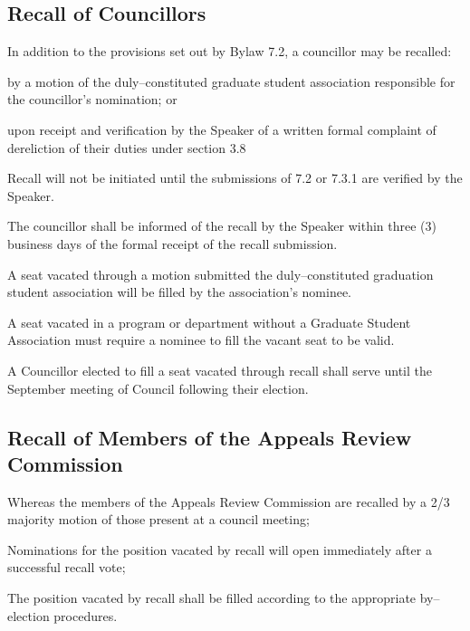 \subsection {Recall of Councillors}
\begin{longenum}[ label*=\thesubsection.\arabic*., align=left]
	\item In addition to the provisions set out by Bylaw 7.2, a councillor may be recalled:
    \begin{longenum}[ label*=\arabic*., align=left]
		\item by a motion of the duly--constituted graduate student association responsible for the councillor's nomination; or
        \item upon receipt and verification by the Speaker of a written formal complaint of dereliction of their duties under section 3.8
	\end{longenum}
    \item Recall will not be initiated until the submissions of 7.2 or 7.3.1 are verified by the Speaker.
    \item The councillor shall be informed of the recall by the Speaker within three (3) business days of the formal receipt of the recall submission.
    \item A seat vacated through a motion submitted the duly--constituted graduation student association will be filled by the association's nominee.
    \item A seat vacated in a program or department without a Graduate Student Association must require a nominee to fill the vacant seat to be valid. 
    \item A Councillor elected to fill a seat vacated through recall shall serve until the September meeting of Council following their election.
\end{longenum}

\subsection{Recall of Members of the Appeals Review Commission}
\begin{longenum}[ label*=\thesubsection.\arabic*., align=left]
	\item Whereas the members of the Appeals Review Commission are recalled by a 2/3 majority motion of those present at a council meeting;
    \item Nominations for the position vacated by recall will open immediately after a successful recall vote;
    \item The position vacated by recall shall be filled according to the appropriate by--election procedures.
\end{longenum}

